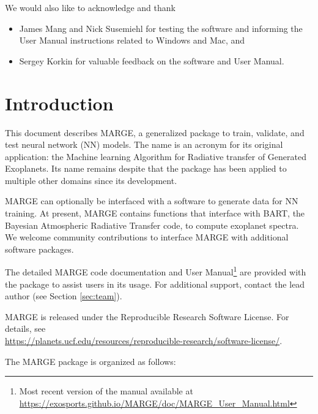 \documentclass[letterpaper, 12pt]{article}
\begin{document}
\noindent We would also like to acknowledge and thank 
\begin{itemize}
	\item James Mang and Nick Susemiehl for testing the software and informing 
        the User Manual instructions related to Windows and Mac, and
    \item Sergey Korkin for valuable feedback on the software and User Manual.
\end{itemize}

\section{Introduction}
\label{sec:theory}

\noindent This document describes MARGE, a generalized package to train, 
validate, and test neural network (NN) models.  The name is an acronym for its 
original application: the Machine learning Algorithm for Radiative transfer of 
Generated Exoplanets.  Its name remains despite that the package has been 
applied to multiple other domains since its development.

MARGE can optionally be interfaced with a software to generate data for NN 
training.  At present, MARGE contains functions that interface with BART, 
the Bayesian Atmospheric Radiative Transfer code, to compute exoplanet 
spectra.  We welcome community contributions to interface MARGE with 
additional software packages.

The detailed MARGE code documentation and User Manual\footnote{Most recent version of the manual available at 
\href{https://exosports.github.io/MARGE/doc/MARGE_User_Manual.html}{https://exosports.github.io/MARGE/doc/MARGE\_User\_Manual.html}} 
are provided with the package to assist users in its usage. 
For additional support, contact the lead author (see Section \ref{sec:team}).

MARGE is released under the Reproducible Research Software License.  
For details, see \\
\href{https://planets.ucf.edu/resources/reproducible-research/software-license/}{https://planets.ucf.edu/resources/reproducible-research/software-license/}.
\newline

\noindent The MARGE package is organized as follows: \newline
\noindent{}
\vspace{0.7cm}
\end{document}
